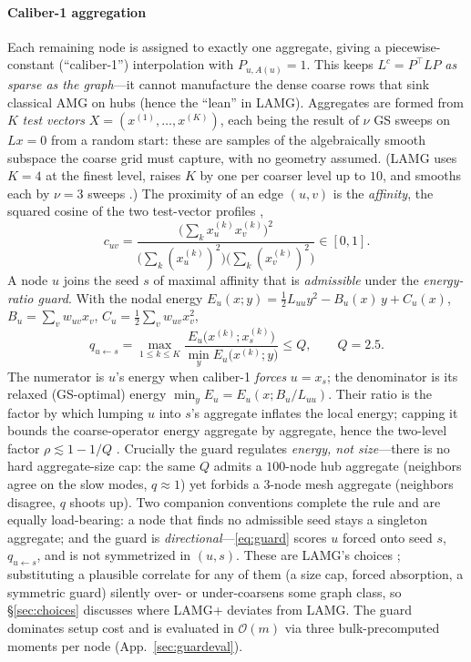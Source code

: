 \documentclass{siamart220329}
\newcommand{\Om}{\mathcal{O}(m)}
\begin{document}
\paragraph{Caliber-1 aggregation} Each remaining node is assigned to exactly one
aggregate, giving a piecewise-constant (``caliber-1'') interpolation with $P_{u,A(u)}=1$.
This keeps $L^c=P^{\top}LP$ \emph{as sparse as the graph}---it cannot manufacture the dense
coarse rows that sink classical AMG on hubs (hence the ``lean'' in LAMG). Aggregates are formed from $K$ \emph{test
vectors} $X=(x^{(1)},\dots,x^{(K)})$, each being the result of $\nu$ GS sweeps on $Lx=0$ from a random start:
these are samples of the algebraically smooth subspace the coarse grid must capture, with
no geometry assumed. (LAMG uses $K=4$ at the finest level, raises $K$ by one per coarser
level up to $10$, and smooths each by $\nu=3$ sweeps \cite[\S4.1]{lamg}.) The proximity of an edge $(u,v)$ is the \emph{affinity}, the squared
cosine of the two test-vector profiles \cite[Eq.~3.3]{lamg},
\begin{equation}\label{eq:aff}
c_{uv}=\frac{\big(\sum_k x^{(k)}_u x^{(k)}_v\big)^2}
{\big(\sum_k (x^{(k)}_u)^2\big)\big(\sum_k (x^{(k)}_v)^2\big)}\in[0,1].
\end{equation}
A node $u$ joins the seed $s$ of maximal affinity that is \emph{admissible} under the
\emph{energy-ratio guard}. With the nodal energy
$E_u(x;y)=\tfrac12 L_{uu}y^2-B_u(x)\,y+C_u(x)$, $B_u=\sum_v w_{uv}x_v$,
$C_u=\tfrac12\sum_v w_{uv}x_v^2$,
\begin{equation}\label{eq:guard}
q_{u\leftarrow s}=\max_{1\le k\le K}
\frac{E_u\!\big(x^{(k)};x^{(k)}_s\big)}{\min_y E_u\!\big(x^{(k)};y\big)}\le Q,\qquad Q=2.5 .
\end{equation}
The numerator is $u$'s energy when caliber-1 \emph{forces} $u=x_s$; the denominator is its
relaxed (GS-optimal) energy $\min_y E_u=E_u(x;B_u/L_{uu})$. Their ratio is the factor by
which lumping $u$ into $s$'s aggregate inflates the local energy; capping it bounds the
coarse-operator energy aggregate by aggregate, hence the two-level factor
$\rho\lesssim 1-1/Q$ \cite[\S3.4]{lamg}. Crucially the guard regulates \emph{energy, not
size}---there is no hard aggregate-size cap: the same $Q$ admits a $100$-node hub
aggregate (neighbors agree on the slow modes, $q\approx1$) yet forbids a $3$-node mesh
aggregate (neighbors disagree, $q$ shoots up). Two companion conventions complete the rule
and are equally load-bearing: a node that finds no admissible seed stays a singleton aggregate;
and the guard is \emph{directional}---\eqref{eq:guard} scores $u$ forced onto seed $s$, $q_{u\leftarrow s}$, and is not symmetrized in $(u,s)$. These
are LAMG's choices \cite[\S3.4]{lamg}; substituting a plausible correlate for any of them (a
size cap, forced absorption, a symmetric guard) silently over- or under-coarsens some graph
class, so \S\ref{sec:choices} discusses where LAMG+ deviates from LAMG. The guard
dominates setup cost and is evaluated in $\Om$ via three bulk-precomputed moments per node
(App.~\ref{sec:guardeval}).
\end{document}
